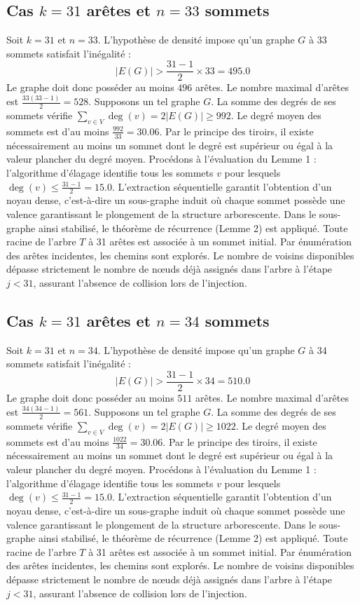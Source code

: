 \documentclass[12pt,a4paper]{article}
\begin{document}
\subsection{Cas $k = 31$ arêtes et $n = 33$ sommets}
Soit $k = 31$ et $n = 33$. L'hypothèse de densité impose qu'un graphe $G$ à 33 sommets satisfait l'inégalité :
$$ |E(G)| > \frac{31-1}{2} \times 33 = 495.0 $$
Le graphe doit donc posséder au moins $496$ arêtes. Le nombre maximal d'arêtes est $\frac{33(33-1)}{2} = 528$.
Supposons un tel graphe $G$. La somme des degrés de ses sommets vérifie $\sum_{v \in V} \deg(v) = 2|E(G)| \geq 992$.
Le degré moyen des sommets est d'au moins $\frac{992}{33} = 30.06$.
Par le principe des tiroirs, il existe nécessairement au moins un sommet dont le degré est supérieur ou égal à la valeur plancher du degré moyen.
Procédons à l'évaluation du Lemme 1 : l'algorithme d'élagage identifie tous les sommets $v$ pour lesquels $\deg(v) \leq \frac{31-1}{2} = 15.0$.
L'extraction séquentielle garantit l'obtention d'un noyau dense, c'est-à-dire un sous-graphe induit où chaque sommet possède une valence garantissant le plongement de la structure arborescente.
Dans le sous-graphe ainsi stabilisé, le théorème de récurrence (Lemme 2) est appliqué. Toute racine de l'arbre $T$ à 31 arêtes est associée à un sommet initial. Par énumération des arêtes incidentes, les chemins sont explorés. Le nombre de voisins disponibles dépasse strictement le nombre de nœuds déjà assignés dans l'arbre à l'étape $j < 31$, assurant l'absence de collision lors de l'injection.

\subsection{Cas $k = 31$ arêtes et $n = 34$ sommets}
Soit $k = 31$ et $n = 34$. L'hypothèse de densité impose qu'un graphe $G$ à 34 sommets satisfait l'inégalité :
$$ |E(G)| > \frac{31-1}{2} \times 34 = 510.0 $$
Le graphe doit donc posséder au moins $511$ arêtes. Le nombre maximal d'arêtes est $\frac{34(34-1)}{2} = 561$.
Supposons un tel graphe $G$. La somme des degrés de ses sommets vérifie $\sum_{v \in V} \deg(v) = 2|E(G)| \geq 1022$.
Le degré moyen des sommets est d'au moins $\frac{1022}{34} = 30.06$.
Par le principe des tiroirs, il existe nécessairement au moins un sommet dont le degré est supérieur ou égal à la valeur plancher du degré moyen.
Procédons à l'évaluation du Lemme 1 : l'algorithme d'élagage identifie tous les sommets $v$ pour lesquels $\deg(v) \leq \frac{31-1}{2} = 15.0$.
L'extraction séquentielle garantit l'obtention d'un noyau dense, c'est-à-dire un sous-graphe induit où chaque sommet possède une valence garantissant le plongement de la structure arborescente.
Dans le sous-graphe ainsi stabilisé, le théorème de récurrence (Lemme 2) est appliqué. Toute racine de l'arbre $T$ à 31 arêtes est associée à un sommet initial. Par énumération des arêtes incidentes, les chemins sont explorés. Le nombre de voisins disponibles dépasse strictement le nombre de nœuds déjà assignés dans l'arbre à l'étape $j < 31$, assurant l'absence de collision lors de l'injection.
\end{document}
